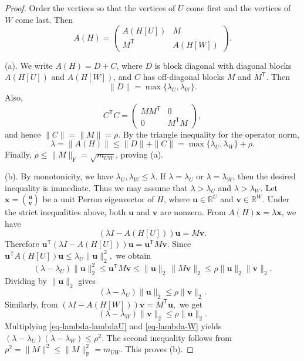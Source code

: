 \documentclass[10pt,a4paper]{amsart}
\begin{document}
\begin{proof}
Order the vertices so that the vertices of \(U\) come first and the
vertices of \(W\) come last.  Then
\[
  A(H)=
  \begin{pmatrix}
    A(H[U]) & M\\
    M^{\mathsf T} & A(H[W])
  \end{pmatrix}.
\]

\smallskip
\noindent\textup{(a).}
We write \(A(H)=D+C\), where \(D\) is block diagonal with diagonal blocks
\(A(H[U])\) and \(A(H[W])\), and \(C\) has off-diagonal blocks \(M\) and
\(M^{\mathsf T}\).  Then
\[
        \|D\|=\max\{\lambda_U,\lambda_W\}.
\]
Also,
\[
        C^{\mathsf T}C
        =
        \begin{pmatrix}
          MM^{\mathsf T} & 0\\
          0 & M^{\mathsf T}M
        \end{pmatrix},
\]
and hence \(\|C\|=\|M\|=\rho\).  By the triangle inequality for the
operator norm,
\[
        \lambda=\|A(H)\|
        \le
        \|D\|+\|C\|
        =
        \max\{\lambda_U,\lambda_W\}+\rho.
\]
Finally, \(\rho\le \|M\|_{\mathrm F}=\sqrt{m_{UW}}\), proving (a).

\smallskip
\noindent\textup{(b).}
By monotonicity, we have \(\lambda_U,\lambda_W\le \lambda\).  If
\(\lambda=\lambda_U\) or \(\lambda=\lambda_W\), then the desired
inequality is immediate.  Thus we may assume that $\lambda>\lambda_U$ and $\lambda>\lambda_W.$
Let $\bm{x}=
        \binom{\bm{u}}{\bm{v}}$
be a unit Perron eigenvector of \(H\), where
\(\bm{u}\in\mathbb R^U\) and \(\bm{v}\in\mathbb R^W\).  Under the strict
inequalities above, both \(\bm{u}\) and \(\bm{v}\) are nonzero.  From
\(A(H)\bm{x}=\lambda\bm{x}\), we have
\[
        (\lambda I-A(H[U]))\bm{u}=M\bm{v}.
\]
Therefore $\bm{u}^{\mathsf T}(\lambda I-A(H[U]))\bm{u}
        =
        \bm{u}^{\mathsf T}M\bm{v}.$
Since $\bm{u}^{\mathsf T}A(H[U])\bm{u}
        \le
        \lambda_U\|\bm{u}\|_2^2,$
we obtain
\[
        (\lambda-\lambda_U)\|\bm{u}\|_2^2
        \le
        \bm{u}^{\mathsf T}M\bm{v}
        \le
        \|\bm{u}\|_2\,\|M\bm{v}\|_2
        \le
        \rho\|\bm{u}\|_2\|\bm{v}\|_2.
\]
Dividing by \(\|\bm{u}\|_2\) gives
\begin{equation}
\label{eq-lambda-lambdaU}
        (\lambda-\lambda_U)\|\bm{u}\|_2
        \le
        \rho\|\bm{v}\|_2.
\end{equation}
Similarly, from
$(\lambda I-A(H[W]))\bm{v}=M^{\mathsf T}\bm{u},$
we get
\begin{equation}
\label{eq-lambda-W}
        (\lambda-\lambda_W)\|\bm{v}\|_2
        \le
        \rho\|\bm{u}\|_2.
\end{equation}
Multiplying \eqref{eq-lambda-lambdaU} and \eqref{eq-lambda-W} yields $(\lambda-\lambda_U)(\lambda-\lambda_W)\le \rho^2.$
The second inequality follows from $\rho^2=\|M\|^2\le \|M\|_{\mathrm F}^2=m_{UW}$.
This proves (b).


\end{proof}
\end{document}
